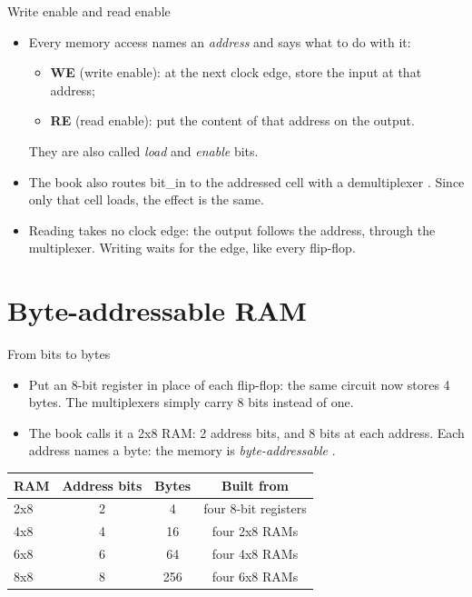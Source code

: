 \documentclass[10pt]{wosm-slides}
\begin{document}
\begin{frame}{Write enable and read enable}
  \begin{itemize}
    \item Every memory access names an \emph{address} and says what to do with it:
      \begin{itemize}
        \item \textbf{WE} (write enable): at the next clock edge, store the input at
          that address;
        \item \textbf{RE} (read enable): put the content of that address on the
          output.
      \end{itemize}
      They are also called \emph{load} and \emph{enable} bits.
    \item The book also routes bit\_in to the addressed cell with a demultiplexer
      . Since only that cell loads, the effect is the same.
    \item Reading takes no clock edge: the output follows the address, through the
      multiplexer. Writing waits for the edge, like every flip-flop.
  \end{itemize}
\end{frame}

\section{Byte-addressable RAM}

\begin{frame}{From bits to bytes}
  \begin{itemize}
    \item Put an 8-bit register in place of each flip-flop: the same circuit now
      stores 4 bytes. The multiplexers simply carry 8 bits instead of one.
    \item The book calls it a \alert{2x8 RAM}: 2 address bits, and 8 bits at each
      address. Each address names a byte: the memory is \emph{byte-addressable}
      .
  \end{itemize}

  \begin{center}
    \begin{tabular}{@{}lccc@{}}
      \toprule
      RAM & Address bits & Bytes & Built from \\
      \midrule
      2x8 & 2 & 4   & four 8-bit registers \\
      4x8 & 4 & 16  & four 2x8 RAMs \\
      6x8 & 6 & 64  & four 4x8 RAMs \\
      8x8 & 8 & 256 & four 6x8 RAMs \\
      \bottomrule
    \end{tabular}
  \end{center}
\end{frame}
\end{document}

